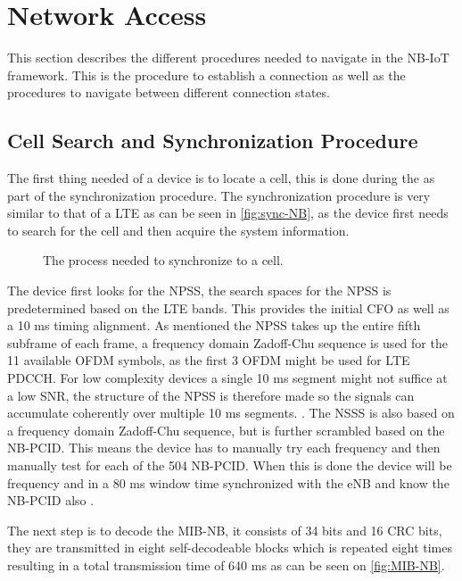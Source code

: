 




\section{Network Access}
This section describes the different procedures needed to navigate in the NB-IoT framework. This is the procedure to establish a connection as well as the procedures to navigate between different connection states. 

\subsection{Cell Search and Synchronization Procedure}
The first thing needed of a device is to locate a cell, this is done during the as part of the synchronization procedure. The synchronization procedure is very similar to that of a \gls{LTE} as can be seen in \autoref{fig:sync-NB}, as the device first needs to search for the cell and then acquire the system information. 


\begin{figure}[H]
\centering

\caption{The process needed to synchronize to a cell.}
\label{fig:sync-NB}
\end{figure}

The device first looks for the \gls{NPSS}, the search spaces for the \gls{NPSS} is predetermined based on the LTE bands.  This provides the initial \gls{CFO} as well as a 10 ms timing alignment. As mentioned the NPSS takes up the entire fifth subframe of each frame, a frequency domain Zadoff-Chu sequence is used for the 11 available \gls{OFDM} symbols, as the first 3 OFDM might be used for LTE PDCCH. For low complexity devices a single 10 ms segment might not suffice at a low \gls{SNR}, the structure of the \gls{NPSS} is therefore made so the signals can accumulate coherently over multiple 10 ms segments. \citep{NB-IoT_Book,primer}. The \gls{NSSS} is also based on a frequency domain Zadoff-Chu sequence, but is further scrambled based on the \gls{NB-PCID}. This means the device has to manually try each frequency and then manually test for each of the 504 NB-PCID. When this is done the device will be frequency and in a 80 ms window time synchronized with the eNB and know the NB-PCID also \citep{NB-IoT_Book,primer}. 

The next step is to decode the \gls{MIB-NB}, it consists of 34 bits and 16 \gls{CRC} bits, they are transmitted in eight self-decodeable blocks which is repeated eight times resulting in a total transmission time of 640 ms as can be seen on \autoref{fig:MIB-NB}. 
 

